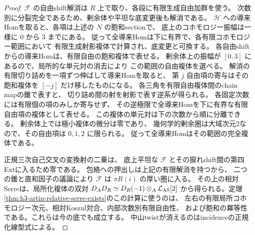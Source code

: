\begin{proof}
$\mathcal F$ の自由shift解消は $R$ 上で取り、各段に有限生成自由加群を使う。
次数別に分裂完全であるため、剰余体や平坦な底変更後も解消である。
$\mathcal H$ への導来Homを取ると、各項は上述の $N$ の飽和sectionで、
底上のコホモロジー振幅は一様に $0$ から $3$ までにある。
従って全導来Homは下に有界で、各有限コホモロジー範囲において
有限生成射影複体で計算され、底変更と可換する。
各自由shiftからの導来Homは、有限自由の飽和複体で表せる。
剰余体上の振幅が $[0,3]$ にあるので、局所的な単元対の消去により
この範囲の自由複体を選べる。
解消の有限切り詰めを一項ずつ伸ばして導来Homを取ると、
第 $j$ 自由項の寄与はその飽和複体を $[-j]$ だけ移したものになる。
各三角を有限自由複体間のchain mapの錐で表すと、
切り詰め間の射を射影で表す逆系が得られる。
各固定次数には有限個の項のみしか寄与せず、
その逆極限で全導来Homを下に有界な有限自由項の複体として表せる。
この複体の単元対は下の次数から順に分離できる。
剰余体上では極小複体の微分は零であり、
幾何学的剰余圏は大域次元2なので、その自由項は $0,1,2$ に限られる。
従って全導来Homはその範囲の完全複体である。

正規三次自己交叉の変換射の二乗は、
底上平坦な $\mathcal F$ とその捩れshift間の第四Extに入るため零である。
包絡への押出しは上記の有限解消を持つから、
二つの錐と直和因子の議論により $\mathcal F$ は $\pi R(i)$ の厚い圏に入る。
その上の相対Serreは、局所化複体の双対
$D_A D_R\simeq D_R(-1)\otimes_A\mathcal L_{\rm AS}[2]$
から得られる。定理\ref{thm:h3-artin-relative-serre-exists}のこの計算に使うのは、
左右の有限局所コホモロジー次元、相対Koszul対合、内部次数別有限自由性、
および飽和の冪等性である。これらは今の底でも成立する。
中山twistが消えるのはincidenceの正規化線型式による。
\end{proof}

